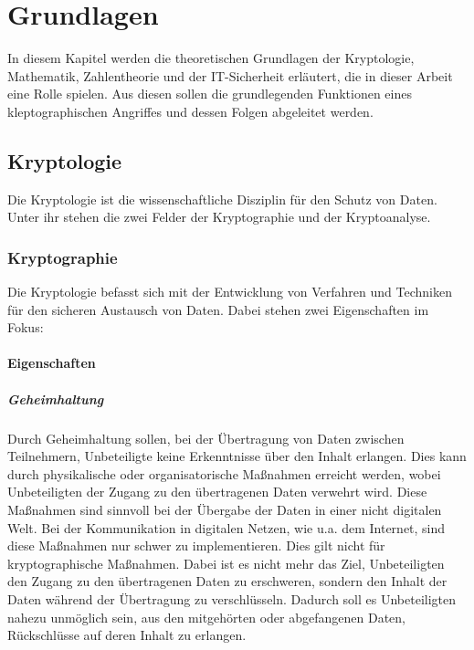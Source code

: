 \chapter{Grundlagen}

In diesem Kapitel werden die theoretischen Grundlagen der Kryptologie, Mathematik, Zahlentheorie und der IT-Sicherheit erläutert, die in dieser Arbeit eine Rolle spielen. Aus diesen sollen die grundlegenden Funktionen eines kleptographischen Angriffes und dessen Folgen abgeleitet werden.

\section{Kryptologie}
    Die Kryptologie ist die wissenschaftliche Disziplin für den Schutz von Daten. Unter ihr stehen die zwei Felder der Kryptographie und der Kryptoanalyse.

    \subsection{Kryptographie}
        Die Kryptologie befasst sich mit der Entwicklung von Verfahren und Techniken für den sicheren Austausch von Daten. Dabei stehen zwei Eigenschaften \cite{BSW.2015} im Fokus:

        \subsubsection{Eigenschaften}
            \paragraph{Geheimhaltung}
                Durch Geheimhaltung sollen, bei der Übertragung von Daten zwischen Teilnehmern, Unbeteiligte keine Erkenntnisse über den Inhalt erlangen. Dies kann durch physikalische oder organisatorische Maßnahmen erreicht werden, wobei Unbeteiligten der Zugang zu den übertragenen Daten verwehrt wird. Diese Maßnahmen sind sinnvoll bei der Übergabe der Daten in einer nicht digitalen Welt. Bei der Kommunikation in digitalen Netzen, wie u.a. dem Internet, sind diese Maßnahmen nur schwer zu implementieren. Dies gilt nicht für kryptographische Maßnahmen. Dabei ist es nicht mehr das Ziel, Unbeteiligten den Zugang zu den übertragenen Daten zu erschweren, sondern den Inhalt der Daten während der Übertragung zu verschlüsseln. Dadurch soll es Unbeteiligten nahezu unmöglich sein, aus den mitgehörten oder abgefangenen Daten, Rückschlüsse auf deren Inhalt zu erlangen.
                
